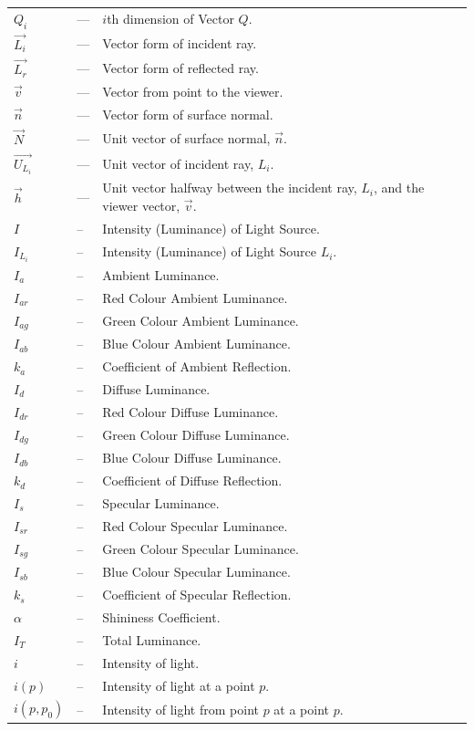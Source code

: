 \documentclass[12pt]{article}
\begin{document}
\begin{longtable*}{l l p{12cm}}
$Q_{i}$ & --- & $i$th dimension of Vector $Q$.
\\
$\vec{L_{i}}$ & --- & Vector form of incident ray.
\\
$\vec{L_{r}}$ & --- & Vector form of reflected ray.
\\
$\vec{v}$ & --- & Vector from point to the viewer.
\\
$\vec{n}$ & --- & Vector form of surface normal.
\\
$\vec{N}$ & --- & Unit vector of surface normal, $\vec{n}$.
\\
$\vec{U_{L_{i}}}$ & --- & Unit vector of incident ray, $L_{i}$. 
\\
$\vec{h}$ & --- & Unit vector halfway between the incident ray, $L_{i}$, and 
the viewer vector, $\vec{v}$.
\\
$I$ & -- & Intensity (Luminance) of Light Source. 
\\
$I_{L_{i}}$ & -- & Intensity (Luminance) of Light Source $L_{i}$. 
\\
$I_{a}$ & -- & Ambient Luminance. 
\\
$I_{ar}$ & -- & Red Colour Ambient Luminance. 
\\
$I_{ag}$ & -- & Green Colour Ambient Luminance. 
\\
$I_{ab}$ & -- & Blue Colour Ambient Luminance. 
\\
$k_{a}$ & -- & Coefficient of Ambient Reflection. 
\\
$I_{d}$ & -- & Diffuse Luminance. 
\\
$I_{dr}$ & -- & Red Colour Diffuse Luminance. 
\\
$I_{dg}$ & -- & Green Colour Diffuse Luminance. 
\\
$I_{db}$ & -- & Blue Colour Diffuse Luminance. 
\\
$k_{d}$ & -- & Coefficient of Diffuse Reflection. 
\\
$I_{s}$ & -- & Specular Luminance. 
\\
$I_{sr}$ & -- & Red Colour Specular Luminance. 
\\
$I_{sg}$ & -- & Green Colour Specular Luminance. 
\\
$I_{sb}$ & -- & Blue Colour Specular Luminance. 
\\
$k_{s}$ & -- & Coefficient of Specular Reflection. 
\\
$\alpha$ & -- & Shininess Coefficient. 
\\
$I_{T}$ & -- & Total Luminance. 
\\
$i$ & -- & Intensity of light. 
\\
$i(p)$ & -- & Intensity of light at a point $p$. 
\\
$i(p, p_{0})$ & -- & Intensity of light from point $p$ at a point $p$. 
\\
\bottomrule
\end{longtable*}
\end{document}
